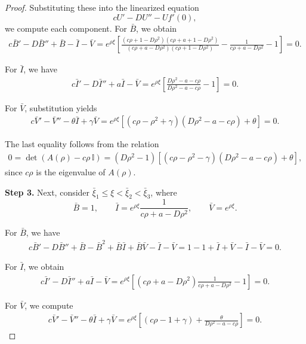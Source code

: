 \documentclass[10pt,a4paper]{amsart}
\begin{document}
\begin{proof}
Substituting these into the linearized equation
\[
cU' - D U'' - U f'(0),
\]
we compute each component. For $\bar{B}$, we obtain
\begin{align}
c\bar{B}' - D\bar{B}'' + \bar{B} - \bar{I} - \bar{V}
= e^{\rho \xi}\left[
\frac{(c\rho +1- D\rho^{2})(c\rho+a+1-D\rho^2)}{(c\rho+a-D\rho^2)(c\rho+1-D\rho^2)}
-\frac{1}{c\rho+a-D\rho^2} - 1
\right]
=0.
\end{align}

For $\bar{I}$, we have
\begin{align}
c\bar{I}' - D\bar{I}'' + a\bar{I} - \bar{V}
= e^{\rho \xi}\left[
\frac{D\rho^{2}-a-c\rho}{D\rho^{2}-a-c\rho} - 1
\right]
=0.
\end{align}

For $\bar{V}$, substitution yields
\begin{align}
c\bar{V}' - \bar{V}'' - \theta \bar{I} + \gamma\bar{V}
= e^{\rho \xi}\left[
(c\rho - \rho^{2} + \gamma)(D\rho^{2}-a-c\rho) + \theta
\right]
=0.
\end{align}

The last equality follows from the relation  
\begin{align}\label{det_identitty_lemma_upper_proof}
0 = \det(A(\rho) - c\rho\,\mathbb{I})
     = (D\rho^{2}-1)\left[(c\rho - \rho^{2} - \gamma)(D\rho^{2}-a-c\rho) + \theta\right],
\end{align}
since $c\rho$ is the eigenvalue of $A(\rho)$.


\textbf{Step 3.} Next, consider $\bar{\xi}_1 \le \xi < \bar{\xi}_2 < \bar{\xi}_3$, where  
\[
\bar{B}=1, 
\qquad 
\bar{I}= e^{\rho \xi}\frac{1}{c\rho+a-D\rho^2},
\qquad 
\bar{V}= e^{\rho \xi}.
\]

For $\bar{B}$, we have
\begin{align}
c\bar{B}'-D\bar{B}''+\bar{B}-\bar{B}^{2}+\bar{B}\bar{I}+\bar{B}\bar{V}-\bar{I}-\bar{V}
= 1 - 1 + \bar{I} + \bar{V} - \bar{I} - \bar{V}
=0.
\end{align}

For $\bar{I}$, we obtain
\begin{align}
c\bar{I}' - D\bar{I}'' + a\bar{I} - \bar{V}
= e^{\rho \xi}\left[
(c\rho+a - D\rho^{2} )\frac{1}{c\rho+a-D\rho^2} - 1
\right]
=0.
\end{align}

For $\bar{V}$, we compute
\begin{align}
c\bar{V}' - \bar{V}'' - \theta \bar{I} + \gamma\bar{V}
= e^{\rho \xi}\left[
(c\rho - 1 + \gamma) + \frac{\theta}{D\rho^{2}-a-c\rho}
\right]
=0.
\end{align}


\end{proof}
\end{document}
